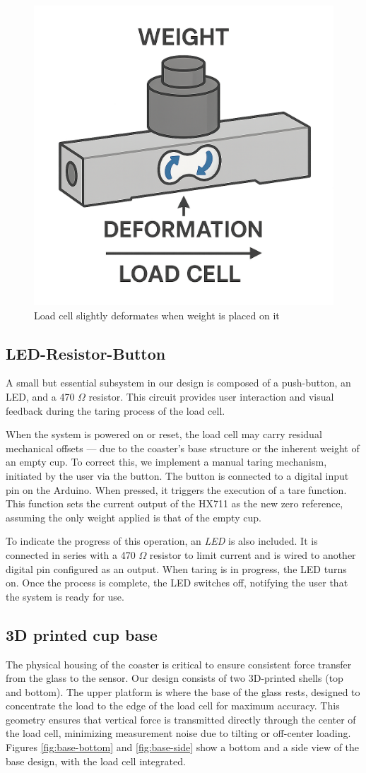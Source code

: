 \begin{figure}[H]
    \centering
    \includegraphics[width=0.35\linewidth]{assets/load cell images/load cell deformation no back.png}
    \caption{Load cell slightly deformates when weight is placed on it}
    \label{fig:loadcell_deforms}
\end{figure}

\subsection{LED-Resistor-Button}
A small but essential subsystem in our design is composed of a push-button, an LED, and a 470 $\Omega$ resistor. This circuit provides user interaction and visual feedback during the taring process of the load cell.

When the system is powered on or reset, the load cell may carry residual mechanical offsets — due to the coaster’s base structure or the inherent weight of an empty cup. To correct this, we implement a manual taring mechanism, initiated by the user via the button.
The button is connected to a digital input pin on the Arduino. When pressed, it triggers the execution of a tare function. This function sets the current output of the HX711 as the new zero reference, assuming the only weight applied is that of the empty cup.

To indicate the progress of this operation, an \textit{LED} is also included. It is connected in series with a 470 $\Omega$ resistor to limit current and is wired to another digital pin configured as an output. When taring is in progress, the LED turns on. Once the process is complete, the LED switches off, notifying the user that the system is ready for use.

\subsection{3D printed cup base}
The physical housing of the coaster is critical to ensure consistent force transfer from the glass to the sensor. Our design consists of two %
3D-printed shells (top and bottom). The upper platform is where the base of the glass rests, designed to %
concentrate the load to the edge of the load cell for maximum accuracy.
This geometry ensures that vertical force is transmitted directly through the center of the load cell, minimizing measurement noise due to tilting or off-center loading. Figures \ref{fig:base-bottom} and \ref{fig:base-side} show a bottom and a side view of the base design, with the load cell integrated.

